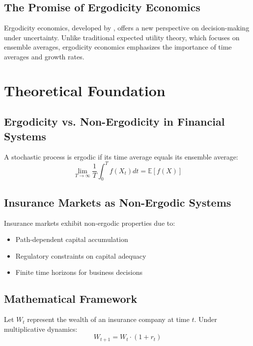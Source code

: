 \documentclass[11pt,letterpaper]{article}
\newcommand{\E}{\mathbb{E}}
\begin{document}
\subsection{The Promise of Ergodicity Economics}

Ergodicity economics, developed by \citet{peters2019ergodicity}, offers a new perspective on decision-making under uncertainty. Unlike traditional expected utility theory, which focuses on ensemble averages, ergodicity economics emphasizes the importance of time averages and growth rates.


\section{Theoretical Foundation}

\subsection{Ergodicity vs. Non-Ergodicity in Financial Systems}

A stochastic process is ergodic if its time average equals its ensemble average:
\begin{equation}
\lim_{T \to \infty} \frac{1}{T} \int_0^T f(X_t) dt = \E[f(X)]
\end{equation}

\subsection{Insurance Markets as Non-Ergodic Systems}

Insurance markets exhibit non-ergodic properties due to:
\begin{itemize}
    \item Path-dependent capital accumulation
    \item Regulatory constraints on capital adequacy
    \item Finite time horizons for business decisions
\end{itemize}

\subsection{Mathematical Framework}

Let $W_t$ represent the wealth of an insurance company at time $t$. Under multiplicative dynamics:
\begin{equation}
W_{t+1} = W_t \cdot (1 + r_t)
\end{equation}
\end{document}
